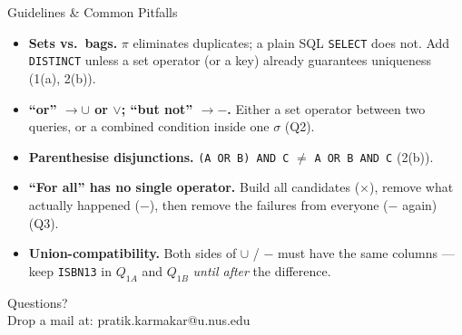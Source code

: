 \documentclass{beamer}
\begin{document}
\begin{frame}{Guidelines \& Common Pitfalls}
\small
\begin{itemize}\itemsep4pt
  \item \textbf{Sets vs.\ bags.} $\pi$ eliminates duplicates; a plain SQL \texttt{SELECT} does not. Add \texttt{DISTINCT} unless a set operator (or a key) already guarantees uniqueness (1(a), 2(b)).
  \item \textbf{``or'' $\to \cup$ or $\vee$; ``but not'' $\to -$.} Either a set operator between two queries, or a combined condition inside one $\sigma$ (Q2).
  \item \textbf{Parenthesise disjunctions.} \texttt{(A OR B) AND C} $\neq$ \texttt{A OR B AND C} (2(b)).
  \item \textbf{``For all'' has no single operator.} Build all candidates ($\times$), remove what actually happened ($-$), then remove the failures from everyone ($-$ again) (Q3).
  \item \textbf{Union-compatibility.} Both sides of $\cup$ / $-$ must have the same columns --- keep \texttt{ISBN13} in $Q_{1A}$ and $Q_{1B}$ \emph{until after} the difference.
\end{itemize}
\end{frame}

\begin{frame}
\begin{center}
Questions?\\
Drop a mail at: pratik.karmakar@u.nus.edu
\end{center}
\end{frame}
\end{document}
